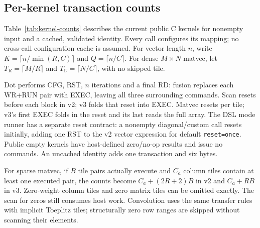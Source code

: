 \subsection{Per-kernel transaction counts}

Table~\ref{tab:kernel-counts} describes the current public C kernels for
nonempty input and a cached, validated identity. Every call configures its
mapping; no cross-call configuration cache is assumed. For vector length $n$,
write $K=\lceil n/\min(R,C)\rceil$ and $Q=\lceil n/C\rceil$.
For dense $M\times N$ matvec, let $T_R=\lceil M/R\rceil$ and
$T_C=\lceil N/C\rceil$, with no skipped tile.



Dot performs CFG, RST, $n$ iterations and a final RD: fusion replaces each
WR+RUN pair with EXEC, leaving all three surrounding commands. Scan resets
before each block in v2; v3 folds that reset into EXEC. Matvec resets per tile;
v3's first EXEC folds in the reset and its last reads the full array.
The DSL mode runner has a separate reset contract: a nonempty diagonal/custom
call resets initially, adding one RST to the v2 vector expression for default
\texttt{reset=once}. Public empty kernels have host-defined zero/no-op results
and issue no commands. An uncached identity adds one transaction and six bytes.

For sparse matvec, if $B$ tile pairs actually execute and $C_a$ column tiles
contain at least one executed pair, the counts become
$C_a+(2R+2)B$ in v2 and $C_a+RB$ in v3. Zero-weight column tiles and zero matrix
tiles can be omitted exactly. The scan for zeros still consumes host work.
Convolution uses the same transfer rules with implicit Toeplitz tiles;
structurally zero row ranges are skipped without scanning their elements.
